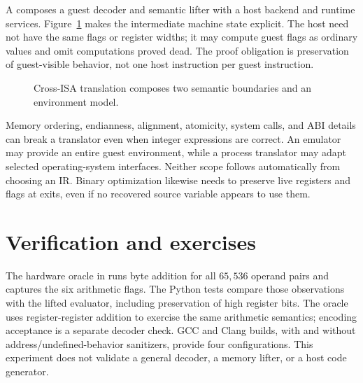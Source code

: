 A  composes a guest decoder and semantic lifter with a host backend and runtime services.
Figure~\ref{fig:ch64-bridge} makes the intermediate machine state explicit.
The host need not have the same flags or register widths; it may compute guest flags as ordinary values and omit computations proved dead.
The proof obligation is preservation of guest-visible behavior, not one host instruction per guest instruction.

\begin{figure}[htbp]
\centering
{}
\caption{Cross-ISA translation composes two semantic boundaries and an environment model.}
\label{fig:ch64-bridge}
\end{figure}

Memory ordering, endianness, alignment, atomicity, system calls, and ABI details can break a translator even when integer expressions are correct.
An emulator may provide an entire guest environment, while a process translator may adapt selected operating-system interfaces.
Neither scope follows automatically from choosing an IR.
Binary optimization likewise needs to preserve live registers and flags at exits, even if no recovered source variable appears to use them.

\section{Verification and exercises}
\label{sec:ch64-exercises}

The hardware oracle in  runs byte addition for all $65{,}536$ operand pairs and captures the six arithmetic flags.
The Python tests compare those observations with the lifted evaluator, including preservation of high register bits.
The oracle uses register-register addition to exercise the same arithmetic semantics; encoding acceptance is a separate decoder check.
GCC and Clang builds, with and without address/undefined-behavior sanitizers, provide four configurations.
This experiment does not validate a general decoder, a memory lifter, or a host code generator.

